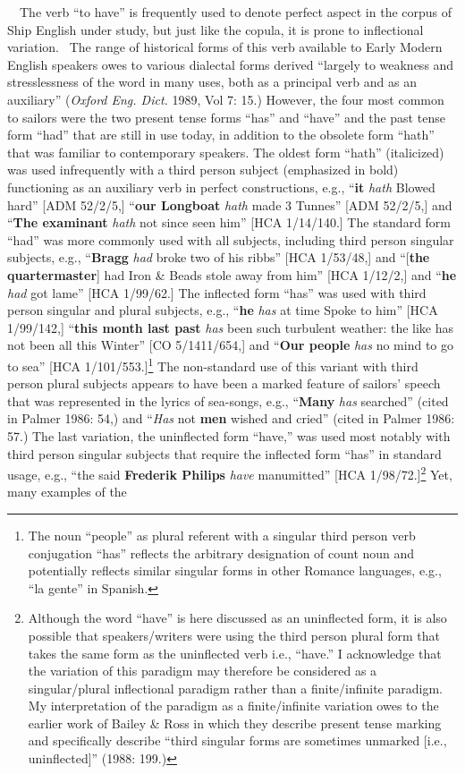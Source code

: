 \begin{styleStandard}
\ \ The verb “to have” is frequently used to denote perfect aspect in the corpus of Ship English under study, but just like the copula, it is prone to inflectional variation. \ The range of historical forms of this verb available to Early Modern English speakers owes to various dialectal forms derived “largely to weakness and stresslessness of the word in many uses, both as a principal verb and as an auxiliary” (\textit{Oxford Eng. Dict. }1989, Vol 7: 15.) However, the four most common to sailors were the two present tense forms “has” and “have” and the past tense form “had” that are still in use today, in addition to the obsolete form “hath” that was familiar to contemporary speakers. The oldest form “hath” (italicized) was used infrequently with a third person subject (emphasized in bold) functioning as an auxiliary verb in perfect constructions, e.g., “\textbf{it} \textit{hath }Blowed hard” [ADM 52/2/5,] “\textbf{our Longboat} \textit{hath }made 3 Tunnes” [ADM 52/2/5,] and “\textbf{The examinant} \textit{hath }not since seen him” [HCA 1/14/140.] The standard form “had” was more commonly used with all subjects, including third person singular subjects, e.g., “\textbf{Bragg} \textit{had }broke two of his ribbs” [HCA 1/53/48,] and “[\textbf{the quartermaster}] had Iron \& Beads stole away from him” [HCA 1/12/2,] and “\textbf{he} \textit{had }got lame” [HCA 1/99/62.] The inflected form “has” was used with third person singular and plural subjects, e.g., “\textbf{he} \textit{has} at time Spoke to him” [HCA 1/99/142,] “\textbf{this month last past} \textit{has} been such turbulent weather: the like has not been all this Winter” [CO 5/1411/654,] and “\textbf{Our people} \textit{has} no mind to go to sea” [HCA 1/101/553.]\footnote{ The noun “people” as plural referent with a singular third person verb conjugation “has” reflects the arbitrary designation of count noun and potentially reflects similar singular forms in other Romance languages, e.g., “la gente” in Spanish.} The non-standard use of this variant with third person plural subjects appears to have been a marked feature of sailors’ speech that was represented in the lyrics of sea-songs, e.g., “\textbf{Many} \textit{has} searched” (cited in Palmer 1986: 54,) and “\textit{Has} not \textbf{men} wished and cried” (cited in Palmer 1986: 57.) The last variation, the uninflected form “have,” was used most notably with third person singular subjects that require the inflected form “has” in standard usage, e.g., “the said \textbf{Frederik Philips} \textit{have }manumitted” [HCA 1/98/72.]\footnote{ Although the word “have” is here discussed as an uninflected form, it is also possible that speakers/writers were using the third person plural form that takes the same form as the uninflected verb i.e., “have.” I acknowledge that the variation of this paradigm may therefore be considered as a singular/plural inflectional paradigm rather than a finite/infinite paradigm. My interpretation of the paradigm as a finite/infinite variation owes to the earlier work of Bailey \& Ross in which they describe present tense marking and specifically describe “third singular forms are sometimes unmarked [i.e., uninflected]” (1988: 199.)} Yet, many examples of the 
\end{styleStandard}
